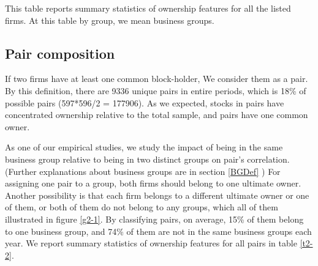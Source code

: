 \documentclass[12pt, a4paper]{article}
\begin{document}
 \begin{table}[htbp]
        \centering
        \caption{ This table reports summary statistics of ownership features for all the listed firms. At this table by group, we mean business groups.}
        \label{t2-1}
        \resizebox{1\textwidth}{!}
        {
        
         }
      \end{table}

\subsection{Pair composition }

  If two firms have at least one common block-holder, We consider them as a pair. By this definition, there are 9336  unique pairs in entire periods, which is 18\% of possible pairs (597*596/2 = 177906). As we expected, stocks in pairs have concentrated ownership relative to the total sample, and pairs have one common owner.
  
  \normalcolor
  
As one of our empirical studies, we study the impact of being in the same business group relative to being in two distinct groups on pair's correlation. (Further explanations about business groups are in section \ref{BGDef} )
   For assigning one pair to a group, both firms should belong to one ultimate owner. Another possibility is that each firm belongs to a different ultimate owner or one of them, or both of them do not belong to any groups, which all of them illustrated in figure \ref{g2-1}.
    By classifying pairs, on average, 15\% of them  belong to one business group, and 74\% of them are not in the same business groups  each year. We report summary statistics of ownership features for all pairs in table \ref{t2-2}.
     
\end{document}

